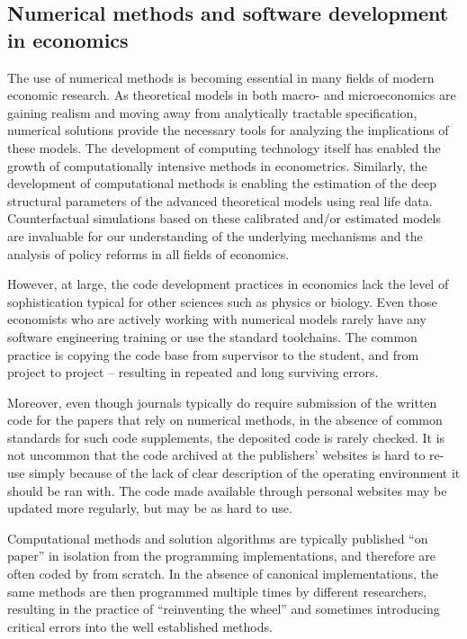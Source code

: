 
\subsection{Numerical methods and software development in economics}

The use of numerical methods is becoming essential in many fields of modern economic research.
As theoretical models in both macro- and microeconomics are gaining realism and moving away from
analytically tractable specification, numerical solutions provide the necessary tools for 
analyzing the implications of these models.
The development of computing technology itself has enabled the growth of computationally intensive
methods in econometrics.
Similarly, the development of computational methods is enabling the estimation of the deep 
structural parameters of the advanced theoretical models using real life data.
Counterfactual simulations based on these calibrated and/or estimated models are 
invaluable for our understanding of the underlying mechanisms and the analysis of 
policy reforms in all fields of economics.

However, at large, the code development practices in economics lack the level of 
sophistication typical for other sciences such as physics or biology.
Even those economists who are actively working with numerical models rarely have 
any software engineering training or use the standard toolchains.
The common practice is copying the code base from supervisor to the student, and from
project to project -- resulting in repeated and long surviving errors.

Moreover, even though journals typically do require submission of the written code for the 
papers that rely on numerical methods, in the absence of common standards for such 
code supplements, the deposited code is rarely checked.  It is not uncommon that the
code archived at the publishers' websites is hard to re-use simply because of the lack
of clear description of the operating environment it should be ran with.
The code made available through personal websites may be updated more regularly, 
but may be as hard to use.

Computational methods and solution algorithms are typically
published ``on paper'' in isolation from the programming implementations, and therefore
are often coded by from scratch.
In the absence of canonical implementations, the same methods are then programmed multiple 
times by different researchers, 
resulting in the practice of ``reinventing the wheel'' and sometimes introducing 
critical errors into the well established methods.

